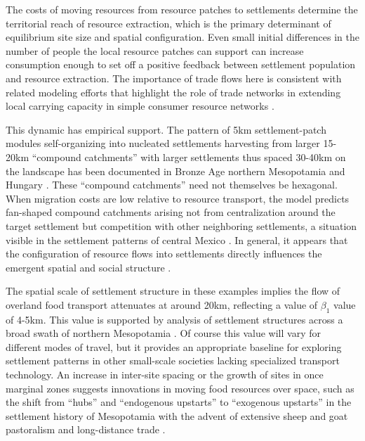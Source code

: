 \documentclass{article}
\begin{document}
The costs of moving resources from resource patches to settlements determine the territorial reach of resource extraction, which is the primary determinant of equilibrium site size and spatial configuration. Even small initial differences in the number of people the local resource patches can support can increase consumption enough to set off a positive feedback between settlement population and resource extraction. The importance of trade flows here is consistent with related modeling efforts that highlight the role of trade networks in extending local carrying capacity in simple consumer resource networks \parencite{Qubbaj2014,Dolfing2019}. 

This dynamic has empirical support. The pattern of 5km settlement-patch modules self-organizing into nucleated settlements harvesting from larger 15-20km ``compound catchments'' with larger settlements thus spaced 30-40km on the landscape has been documented in Bronze Age northern Mesopotamia and Hungary \parencite{Wilkinson1994, Duffy2011SiteSocieties}. These ``compound catchments'' need not themselves be hexagonal. When migration costs are low relative to resource transport, the model predicts fan-shaped compound catchments arising not from centralization around the target settlement but competition with other neighboring settlements, a situation visible in the settlement patterns of central Mexico \parencite{Hirth1978}. In general, it appears that the configuration of resource flows into settlements directly influences the emergent spatial and social structure \parencite{Crabtree2017a}.

The spatial scale of settlement structure in these examples implies the flow of overland food transport attenuates at around 20km, reflecting a value of $\beta_1$ value of 4-5km. This value is supported by analysis of settlement structures across a broad swath of northern Mesopotamia \parencite{Menze2012MappingScale}. Of course this value will vary for different modes of travel, but it provides an appropriate baseline for exploring settlement patterns in other small-scale societies lacking specialized transport technology. An increase in inter-site spacing or the growth of sites in once marginal zones suggests innovations in moving food resources over space, such as the shift from ``hubs'' and ``endogenous upstarts'' to ``exogenous upstarts'' in the settlement history of Mesopotamia with the advent of extensive sheep and goat pastoralism and long-distance trade \parencite{Lawrence2015HubsCrescent, Lawrence2016}.
\end{document}
